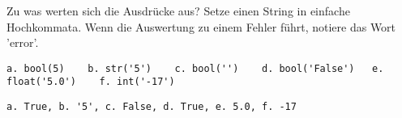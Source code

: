 \question[3]
Zu was werten sich die Ausdrücke aus? Setze einen String in einfache Hochkommata.
Wenn die Auswertung zu einem Fehler führt, notiere das
Wort 'error'.

\begin{lstlisting}
a. bool(5)    b. str('5')    c. bool('')    d. bool('False')   e. float('5.0')    f. int('-17')
\end{lstlisting}
\begin{solutionbox}{2cm}
\begin{lstlisting}
a. True, b. '5', c. False, d. True, e. 5.0, f. -17
\end{lstlisting}
\end{solutionbox}
